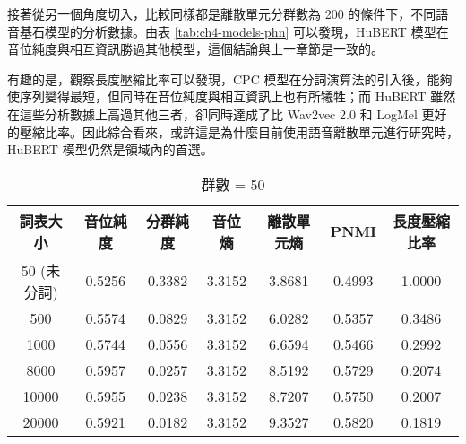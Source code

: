 接著從另一個角度切入，比較同樣都是離散單元分群數為 200 的條件下，不同語音基石模型的分析數據。由表 \ref{tab:ch4-models-phn} 可以發現，HuBERT 模型在音位純度與相互資訊勝過其他模型，這個結論與上一章節是一致的。

有趣的是，觀察長度壓縮比率可以發現，CPC 模型在分詞演算法的引入後，能夠使序列變得最短，但同時在音位純度與相互資訊上也有所犧牲；而 HuBERT 雖然在這些分析數據上高過其他三者，卻同時達成了比 Wav2vec 2.0 和 LogMel 更好的壓縮比率。因此綜合看來，或許這是為什麼目前使用語音離散單元進行研究時，HuBERT 模型仍然是領域內的首選。

        \begin{table}[!htbp]
            \centering
            \begin{subtable}[t]{\textwidth}
                \centering
                \begin{tabular}{|c|c|c|c|c|c|c|} \hline 
                        詞表大小  & 音位純度 & 分群純度 & 音位熵 & 離散單元熵 &    PNMI & 長度壓縮比率 \\ \hline 
 50 (未分詞)& 0.5256& 0.3382& 3.3152& 3.8681& 0.4993&1.0000\\ \hline 
                           500  &   0.5574   &  0.0829 &   3.3152  &  6.0282 & 0.5357 & 0.3486  \\ \hline %
                          1000  &   0.5744   &  0.0556 &   3.3152  &  6.6594 & 0.5466 & 0.2992  \\ \hline %
                          8000  &   0.5957   &  0.0257 &   3.3152  &  8.5192 & 0.5729 & 0.2074  \\ \hline %
                         10000  &   0.5955   &  0.0238 &   3.3152  &  8.7207 & 0.5750 & 0.2007  \\ \hline %
                         20000  &   0.5921   &  0.0182 &   3.3152  &  9.3527 & 0.5820 & 0.1819  \\ \hline %
                \end{tabular}
\caption{群數 = 50}
                \label{tab:ch4-hubert-phn-clu050}
            \end{subtable}        

            \jefftablesep        


\end{table}
